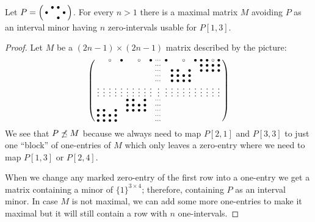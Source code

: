 \begin{lemma}
\label{lemma:unbound}
Let $P=\left(\begin{smallmatrix} &\bullet&\bullet& \\\bullet& & &\bullet\\ & &\bullet& \end{smallmatrix}\right)$. For every $n>1$ there is a maximal matrix $M$ avoiding $P$ as an interval minor having $n$ zero-intervals usable for $P[1,3]$.
\end{lemma}
\begin{proof} Let $M$ be a $(2n-1)\times(2n-1)$ matrix described by the picture:
$$\left(\begin{smallmatrix}	 & &\circ& &\bullet& & &\circ& &\bullet&\cdots&\bullet& & &\circ& &\bullet&\bullet&\bullet&\circ&\bullet\\
		 & & & & & & & & & &\cdots& & & & & & &\bullet&\bullet&\bullet&\bullet\\
		 & & & & & & & & & &\cdots& &\bullet&\bullet& &\bullet& &\bullet&\bullet&\bullet&\bullet\\
		 & & & & & & & & & &\cdots& &\bullet&\bullet&\bullet&\bullet& & & & & \\
		 & & & & & & & & & &\cdots& &\bullet&\bullet&\bullet&\bullet& & & & & \\
		\vdots&\vdots&\vdots&\vdots&\vdots&\vdots&\vdots&\vdots&\vdots&\vdots&\vdots&\vdots&\vdots&\vdots&\vdots&\vdots&\vdots&\vdots&\vdots&\vdots&\vdots\\
		 & & & & &\bullet&\bullet& &\bullet& &\cdots& & & & & & & \\
		 & & & & &\bullet&\bullet&\bullet&\bullet& &\cdots& & & & & & & \\
		\bullet&\bullet& &\bullet& &\bullet&\bullet&\bullet&\bullet& &\cdots& & & & & & & \\
		\bullet&\bullet&\bullet&\bullet& & & & & & &\cdots& & & & & & & \\
		\bullet&\bullet&\bullet&\bullet& & & & & & &\cdots& & & & & & & \\
		 \end{smallmatrix}\right)$$
We see that $P\not\preceq M$ because we always need to map $P[2,1]$ and $P[3,3]$ to just one ``block'' of one-entries of $M$ which only leaves a zero-entry where we need to map $P[1,3]$ or $P[2,4]$.

When we change any marked zero-entry of the first row into a one-entry we get a matrix containing a minor of $\{1\}^{3\times4}$; therefore, containing $P$ as an interval minor. In case $M$ is not maximal, we can add some more one-entries to make it maximal but it will still contain a row with $n$ one-intervals.
\end{proof}

